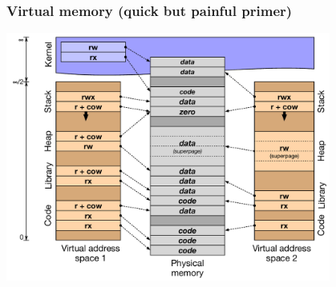 \begin{frame}
  \frametitle{Virtual memory (quick but painful primer)}

  \begin{center}
    \includegraphics[width=0.8\textwidth]{../../figures/process-address-space.pdf}
  \end{center}
\end{frame}

